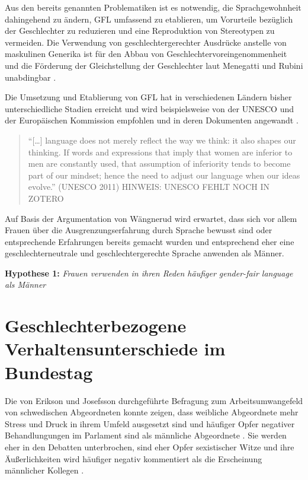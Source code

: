 \documentclass[12pt, 
    twoside=false, 
    bibliography=totoc, 
    numbers=endperiod, 
    headings=normal, 
    toc=chapterentrydotfill
    ]{scrbook}
\begin{document}
Aus den bereits genannten Problematiken ist es notwendig, die Sprachgewohnheit dahingehend zu ändern, GFL umfassend zu etablieren, um Vorurteile bezüglich der Geschlechter zu reduzieren und eine Reproduktion von Stereotypen zu vermeiden. Die Verwendung von geschlechtergerechter Ausdrücke anstelle von maskulinen Generika ist für den Abbau von Geschlechtervoreingenommenheit und die Förderung der Gleichstellung der Geschlechter laut Menegatti und Rubini unabdingbar \parencite*{menegatti_2017}.

Die Umsetzung und Etablierung von GFL hat in verschiedenen Ländern bisher unterschiedliche Stadien erreicht und wird beispielsweise von der UNESCO und der Europäischen Kommission empfohlen und in deren Dokumenten angewandt \parencite[4]{sczesny_2016}.

\begin{quote}
    \enquote{[…] language does not merely reflect the way we think: it also shapes our thinking. If words and expressions that imply that women are inferior to men are constantly used, that assumption of inferiority tends to become part of our mindset; hence the need to adjust our language when our ideas evolve.} (UNESCO 2011) HINWEIS: UNESCO FEHLT NOCH IN ZOTERO
\end{quote}

Auf Basis der Argumentation von Wängnerud \parencites*{wangnerud_2000}{wangnerud_2009} wird erwartet, dass sich vor allem Frauen über die Ausgrenzungserfahrung durch Sprache bewusst sind oder entsprechende Erfahrungen bereits gemacht wurden und entsprechend eher eine geschlechterneutrale und geschlechtergerechte Sprache anwenden als Männer. 

\textbf{Hypothese 1:} \emph{Frauen verwenden in ihren Reden häufiger gender-fair language als Männer}

\section{Geschlechterbezogene Verhaltensunterschiede im Bundestag}


Die von Erikson und Josefsson durchgeführte Befragung zum Arbeitsumwangefeld von schwedischen Abgeordneten konnte zeigen, dass weibliche Abgeordnete mehr Stress und Druck in ihrem Umfeld ausgesetzt sind und häufiger Opfer negativer Behandlungungen im Parlament sind als männliche Abgeordnete \parencite{erikson_2018}. Sie werden eher in den Debatten unterbrochen, sind eher Opfer sexistischer Witze und ihre Äußerlichkeiten wird häufiger negativ kommentiert als die Erscheinung männlicher Kollegen \parencite[13]{erikson_2018}.
\end{document}
